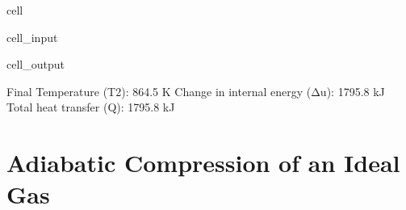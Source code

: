 \documentclass[letterpaper,10pt,english]{jupyterBook}
\begin{document}
\begin{sphinxuseclass}{cell}
\begin{sphinxVerbatimInput}
\begin{sphinxuseclass}{cell_input}
\begin{sphinxVerbatim}[commandchars=\\\{\}]
\end{sphinxVerbatim}

\end{sphinxuseclass}\end{sphinxVerbatimInput}
\begin{sphinxVerbatimOutput}

\begin{sphinxuseclass}{cell_output}
\begin{sphinxVerbatim}[commandchars=\\\{\}]
Final Temperature (T2): 864.5 K
Change in internal energy (Δu): 1795.8 kJ
Total heat transfer (Q): 1795.8 kJ
\end{sphinxVerbatim}

\end{sphinxuseclass}\end{sphinxVerbatimOutput}

\end{sphinxuseclass}
\sphinxstepscope


\section{Adiabatic Compression of an Ideal Gas}
\label{\detokenize{notebooks/Chapter4/Adiabatic_Compression_Problem_4:adiabatic-compression-of-an-ideal-gas}}\label{\detokenize{notebooks/Chapter4/Adiabatic_Compression_Problem_4::doc}}
\end{document}
